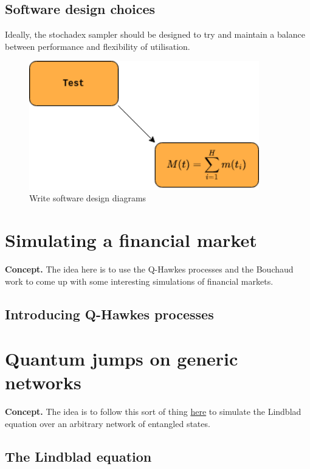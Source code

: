 \documentclass{book}
\begin{document}
\section{\sffamily Software design choices}

Ideally, the stochadex sampler should be designed to try and maintain a balance between performance and flexibility of utilisation.

\begin{figure}[h]
\includegraphics[width=10cm]{images/test.drawio.png}
\caption{Write software design diagrams}
\label{fig:design}
\end{figure}


\chapter{\sffamily Simulating a financial market}

{\bfseries\sffamily Concept.} The idea here is to use the Q-Hawkes processes and the Bouchaud work to come up with some interesting simulations of financial markets. 

\section{\sffamily Introducing Q-Hawkes processes}


\chapter{\sffamily Quantum jumps on generic networks}

{\bfseries\sffamily Concept.} The idea is to follow this sort of thing \href{https://en.wikipedia.org/wiki/Quantum_jump_method}{here} to simulate the Lindblad equation over an arbitrary network of entangled states.

\section{\sffamily The Lindblad equation}
\end{document}

